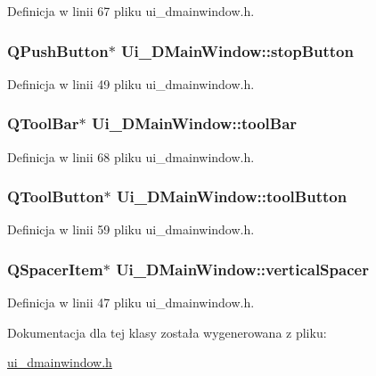 Definicja w linii 67 pliku ui\-\_\-dmainwindow.\-h.

\hypertarget{class_ui___d_main_window_a1fe7797fff349a0f0d47d90c8438f386}{
\subsubsection[{stop\-Button}]{\setlength{\rightskip}{0pt plus 5cm}Q\-Push\-Button$\ast$ Ui\-\_\-\-D\-Main\-Window\-::stop\-Button}}\label{class_ui___d_main_window_a1fe7797fff349a0f0d47d90c8438f386}


Definicja w linii 49 pliku ui\-\_\-dmainwindow.\-h.

\hypertarget{class_ui___d_main_window_abba1dae1dd835c7a7dd39da623cd4580}{
\subsubsection[{tool\-Bar}]{\setlength{\rightskip}{0pt plus 5cm}Q\-Tool\-Bar$\ast$ Ui\-\_\-\-D\-Main\-Window\-::tool\-Bar}}\label{class_ui___d_main_window_abba1dae1dd835c7a7dd39da623cd4580}


Definicja w linii 68 pliku ui\-\_\-dmainwindow.\-h.

\hypertarget{class_ui___d_main_window_a97093acead8089d7f4b26fab4b1c8a65}{
\subsubsection[{tool\-Button}]{\setlength{\rightskip}{0pt plus 5cm}Q\-Tool\-Button$\ast$ Ui\-\_\-\-D\-Main\-Window\-::tool\-Button}}\label{class_ui___d_main_window_a97093acead8089d7f4b26fab4b1c8a65}


Definicja w linii 59 pliku ui\-\_\-dmainwindow.\-h.

\hypertarget{class_ui___d_main_window_a476471e78bf431c7487fa9e0afadb76d}{
\subsubsection[{vertical\-Spacer}]{\setlength{\rightskip}{0pt plus 5cm}Q\-Spacer\-Item$\ast$ Ui\-\_\-\-D\-Main\-Window\-::vertical\-Spacer}}\label{class_ui___d_main_window_a476471e78bf431c7487fa9e0afadb76d}


Definicja w linii 47 pliku ui\-\_\-dmainwindow.\-h.



Dokumentacja dla tej klasy została wygenerowana z pliku\-:\begin{DoxyCompactItemize}
\item 
\hyperlink{ui__dmainwindow_8h}{ui\-\_\-dmainwindow.\-h}\end{DoxyCompactItemize}
